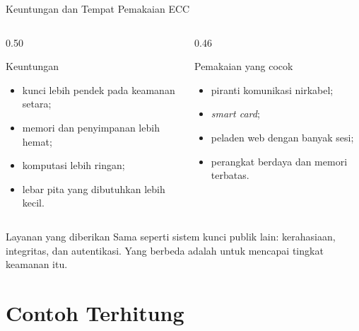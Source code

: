 \documentclass[aspectratio=169,11pt]{beamer}
\begin{document}
\begin{frame}{Keuntungan dan Tempat Pemakaian ECC}
    \begin{columns}[T,onlytextwidth]
        \begin{column}{0.50\textwidth}
            \begin{block}{Keuntungan}
                \footnotesize
                \begin{itemize}
                    \item kunci lebih pendek pada keamanan setara;
                    \item memori dan penyimpanan lebih hemat;
                    \item komputasi lebih ringan;
                    \item lebar pita yang dibutuhkan lebih kecil.
                \end{itemize}
            \end{block}
        \end{column}
        \begin{column}{0.46\textwidth}
            \begin{block}{Pemakaian yang cocok}
                \footnotesize
                \begin{itemize}
                    \item piranti komunikasi nirkabel;
                    \item \textit{smart card};
                    \item peladen web dengan banyak sesi;
                    \item perangkat berdaya dan memori terbatas.
                \end{itemize}
            \end{block}
        \end{column}
    \end{columns}
    \vspace{0.15cm}
    \begin{exampleblock}{Layanan yang diberikan}
        \footnotesize
        Sama seperti sistem kunci publik lain: kerahasiaan, integritas, dan
        autentikasi. Yang berbeda adalah  untuk mencapai tingkat
        keamanan itu.
    \end{exampleblock}
\end{frame}

\section{Contoh Terhitung}
\end{document}
